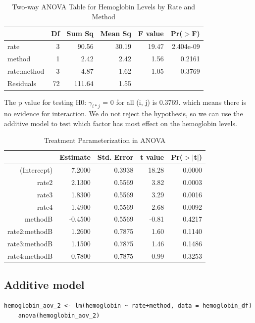 \documentclass{article}
\begin{document}
\begin{table}[ht]
\centering
\caption{Two-way ANOVA Table for Hemoglobin Levels by Rate and Method} 
\label{tab:hemoglobin_anova}
\begin{tabular}{lrrrrr}
  \hline
 & Df & Sum Sq & Mean Sq & F value & Pr($>$F) \\ 
  \hline
rate & 3 & 90.56 & 30.19 & 19.47 & 2.404e-09 \\ 
  method & 1 & 2.42 & 2.42 & 1.56 & 0.2161 \\ 
  rate:method & 3 & 4.87 & 1.62 & 1.05 & 0.3769 \\ 
  Residuals & 72 & 111.64 & 1.55 &  &  \\ 
   \hline
\end{tabular}
\end{table}

The p value for testing H0: $\gamma_{i*j}$ = 0 for all (i, j) is 0.3769. which means there is no evidence for interaction. We do not reject the hypothesis, so we can use the additive model to test which factor has most effect on the hemoglobin levels. 

\begin{table}[ht]
\caption{Treatment Parameterization in ANOVA}
\label{tab:treatment}
\centering
\begin{tabular}{rrrrr}
  \hline
 & Estimate & Std. Error & t value & Pr($>$$|$t$|$) \\ 
  \hline
(Intercept) & 7.2000 & 0.3938 & 18.28 & 0.0000 \\ 
  rate2 & 2.1300 & 0.5569 & 3.82 & 0.0003 \\ 
  rate3 & 1.8300 & 0.5569 & 3.29 & 0.0016 \\ 
  rate4 & 1.4900 & 0.5569 & 2.68 & 0.0092 \\ 
  methodB & -0.4500 & 0.5569 & -0.81 & 0.4217 \\ 
  rate2:methodB & 1.2600 & 0.7875 & 1.60 & 0.1140 \\ 
  rate3:methodB & 1.1500 & 0.7875 & 1.46 & 0.1486 \\ 
  rate4:methodB & 0.7800 & 0.7875 & 0.99 & 0.3253 \\ 
   \hline
\end{tabular}
\end{table}

\subsection{Additive model}
\begin{lstlisting}[caption="Additive model for Two-Way ANOVA", label={lst:Add}]
    hemoglobin_aov_2 <- lm(hemoglobin ~ rate+method, data = hemoglobin_df)
    anova(hemoglobin_aov_2) 
\end{lstlisting}
\end{document}
